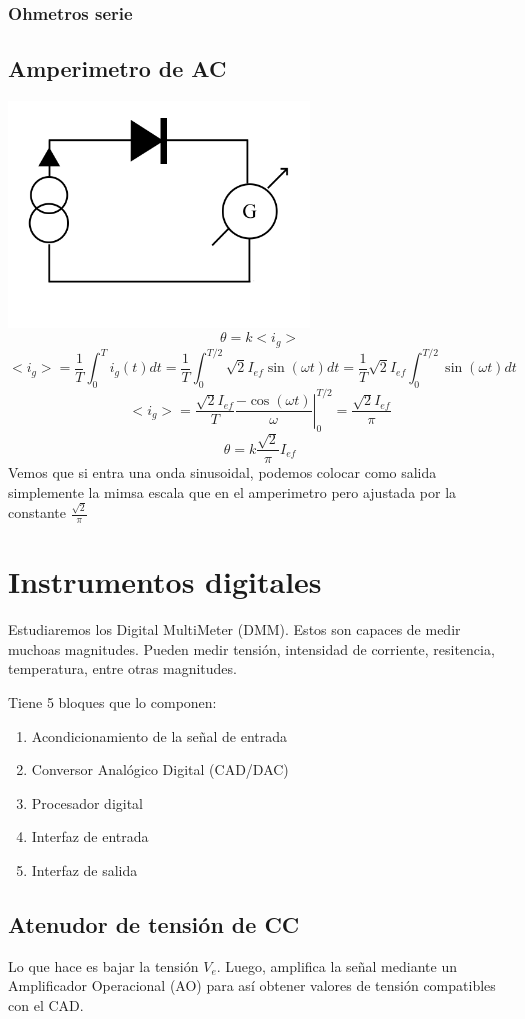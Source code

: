 \documentclass{report}
\begin{document}
\subsection{Ohmetros serie}

\section{Amperimetro de AC}

\includegraphics[width=8cm]{../Assets/amperimetro_galvanometro_ac.jpg}
\[
	\theta = k <i_g>
\]
\[
	<i_g> = \frac{1}{T}\int_{0}^{T}{i_g(t)dt} =
	\frac{1}{T}\int_{0}^{T/2}{\sqrt{2}I_{ef}\sin(\omega t)dt} =
	\frac{1}{T}\sqrt{2}I_{ef}\int_{0}^{T/2}{\sin(\omega t)dt}
\]
\[
	<i_g> = \frac{\sqrt{2}I_{ef}}{T}\left.\frac{-\cos(\omega t)}{\omega}\right|_0^{T/2} =
	\frac{\sqrt{2}I_{ef}}{\pi}
\]
\[
	\boxed{
		\theta = k \frac{\sqrt{2}}{\pi} I_{ef}
	}
\]
Vemos que si entra una onda sinusoidal, podemos colocar como salida simplemente la mimsa escala que en el amperimetro pero ajustada por la constante \(\frac{\sqrt 2}{\pi}\)

\chapter{Instrumentos digitales}
Estudiaremos los Digital MultiMeter (DMM). Estos son capaces de medir muchoas magnitudes.
Pueden medir tensión, intensidad de corriente, resitencia, temperatura, entre otras magnitudes.

Tiene 5 bloques que lo componen:
\begin{enumerate}
	\item Acondicionamiento de la señal de entrada
	\item Conversor Analógico Digital (CAD/DAC)
	\item Procesador digital
	\item Interfaz de entrada
	\item Interfaz de salida
\end{enumerate}

\section{Atenudor de tensión de CC}
Lo que hace es bajar la tensión \(V_e\).
Luego, amplifica la señal mediante un Amplificador Operacional (AO) para así obtener valores de tensión compatibles con el CAD.
\end{document}
